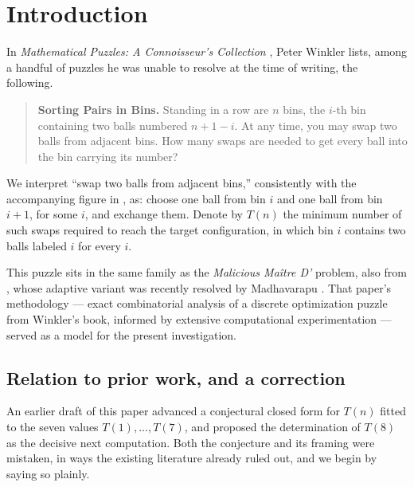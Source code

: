 \documentclass[11pt]{amsart}
\theoremstyle{plain}
\theoremstyle{definition}
\theoremstyle{remark}
\begin{document}
\maketitle

\section{Introduction}

In \emph{Mathematical Puzzles: A Connoisseur's Collection} \cite{Winkler}, Peter Winkler lists, among a handful of puzzles he was unable to resolve at the time of writing, the following.

\begin{quote}
\textbf{Sorting Pairs in Bins.} Standing in a row are $n$ bins, the $i$-th bin containing two balls numbered $n+1-i$. At any time, you may swap two balls from adjacent bins. How many swaps are needed to get every ball into the bin carrying its number?
\end{quote}

We interpret ``swap two balls from adjacent bins,'' consistently with the accompanying figure in \cite{Winkler}, as: choose one ball from bin $i$ and one ball from bin $i+1$, for some $i$, and exchange them. Denote by $T(n)$ the minimum number of such swaps required to reach the target configuration, in which bin $i$ contains two balls labeled $i$ for every $i$.

This puzzle sits in the same family as the \emph{Malicious Ma\^itre D'} problem, also from \cite{Winkler}, whose adaptive variant was recently resolved by Madhavarapu \cite{MaitreD}. That paper's methodology --- exact combinatorial analysis of a discrete optimization puzzle from Winkler's book, informed by extensive computational experimentation --- served as a model for the present investigation.

\subsection{Relation to prior work, and a correction}
\label{sec:priorwork}

An earlier draft of this paper advanced a conjectural closed form for $T(n)$ fitted to the seven values $T(1),\dots,T(7)$, and proposed the determination of $T(8)$ as the decisive next computation. Both the conjecture and its framing were mistaken, in ways the existing literature already ruled out, and we begin by saying so plainly.
\end{document}
